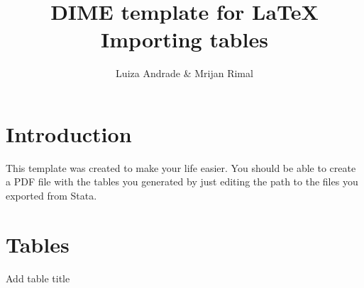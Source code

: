 \documentclass{article}                 %
\title{DIME template for \LaTeX \\ Importing tables} 	%
\author{Luiza Andrade \& Mrijan Rimal}
\begin{document}

    \maketitle
    \tableofcontents        %
    \listoftables			%

    \newpage
    \section{Introduction} %

        This template was created to make your life easier. You should be able to create a PDF file with the tables you generated by just editing the path to the files you exported from Stata.

    \section{Tables}

   		

		\begin{table}[H]
			\caption{Add table title}
			
		\end{table}
\end{document}
